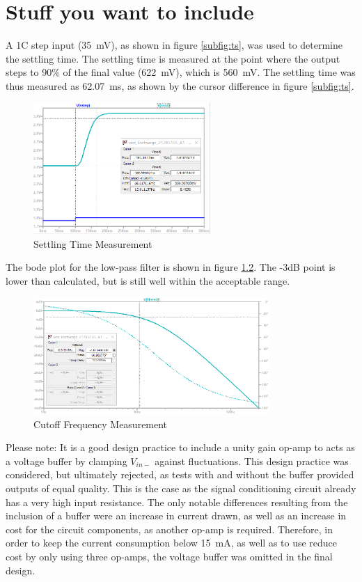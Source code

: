      \chapter{Stuff you want to include}

A 1\degree C step input (\SI{35}{\milli\volt}), as shown in figure \ref{subfig:ts}, was used to determine the settling time. The settling time is measured at the point where the output steps to 90\% of the final value (\SI{622}{\milli\volt}), which is \SI{560}{\milli\volt}. The settling time was thus measured as \SI{62.07}{ms}, as shown by the cursor difference in figure \ref{subfig:ts}.
\begin{figure}[h]
    \centering
    \includegraphics[width = 0.6\textwidth]{Figures/ts.png}
    \caption{Settling Time Measurement}
    \label{fig:ts}
\end{figure}

The bode plot for the low-pass filter is shown in figure \ref{fig:ac}. The -3dB point is lower than calculated, but is still well within the acceptable range. 
\begin{figure}[h]
    \centering
    \includegraphics[width = 0.8\textwidth]{Figures/ac.png}
    \caption{Cutoff Frequency Measurement}
    \label{fig:ac}
\end{figure}

Please note:
It is a good design practice to include a unity gain op-amp to acts as a voltage buffer by clamping $V_{in-}$ against fluctuations. This design practice was considered, but ultimately rejected, as tests with and without the buffer provided outputs of equal quality. This is the case as the signal conditioning circuit already has a very high input resistance. The only notable differences resulting from the inclusion of a buffer were an increase in current drawn, as well as an increase in cost for the circuit components, as another op-amp is required. Therefore, in order to keep the current consumption below \SI{15}{mA}, as well as to use reduce cost by only using three op-amps, the voltage buffer was omitted in the final design.\\
